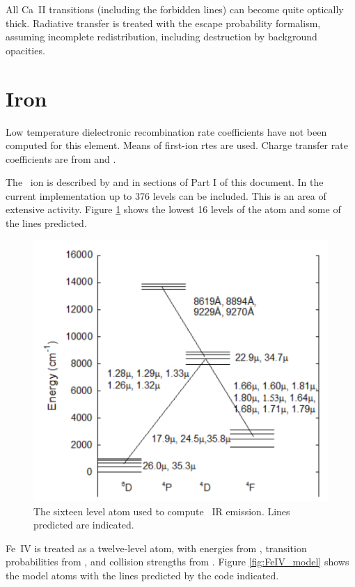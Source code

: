 All Ca~II transitions (including the forbidden lines) can become quite
optically thick.  Radiative transfer is treated with the escape probability
formalism, assuming incomplete redistribution, including destruction by
background opacities.

\section{Iron}

Low temperature dielectronic recombination rate coefficients have not
been computed for this element.  Means of first-ion rtes are used.  Charge transfer
rate coefficients are from \citet{Neufeld1989} and
\citet{Ferland1997}.

The \feii\ ion is described by \citet{Verner1999} and in sections of
Part I of this document.  In the current implementation up to 376 levels
can be included. This is an area of extensive activity.
Figure \ref{fig:FeII_model} shows
the lowest 16 levels of the atom and some of the lines predicted.

\begin{figure}
\centering
\label{fig:FeII_model}
\includegraphics[scale=0.7]{FeII_model}
\caption[\feii\ model of low-lying levels]{The sixteen level atom used to compute \feii\ IR emission.  Lines
predicted are indicated.}
\end{figure}

Fe~IV is treated as a twelve-level atom, with energies from
\citet{Sugar1985}, transition probabilities from \citet{Garstang1958}, and collision
strengths from \citet{Berrington1995}.
Figure \ref{fig:FeIV_model} shows the model atoms
with the lines predicted by the code indicated.

